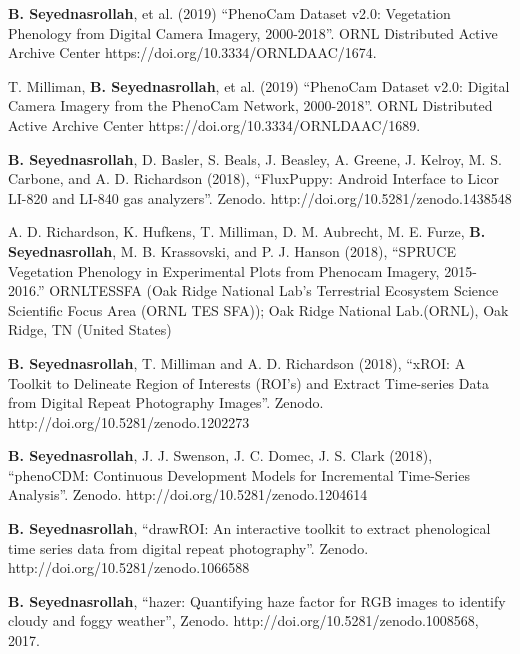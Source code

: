 \documentclass[10pt]{article}
\newenvironment{changemargin}[2]{%
  \begin{list}{}{%
    \setlength{\topsep}{0pt}%
    \setlength{\leftmargin}{#1}%
    \setlength{\rightmargin}{#2}%
    \setlength{\listparindent}{\parindent}%
    \setlength{\itemindent}{\parindent}%
    \setlength{\parsep}{\parskip}%
  }%
  \item[]}{\end{list}
}
\newenvironment{body} {
	\vspace*{-2pt}
	\begin{changemargin}{-0.5in}{-0.5in}
  }
	{\end{changemargin}
}
\begin{document}
\begin{body}

\textbf{B. Seyednasrollah}, et al. (2019) ``PhenoCam Dataset v2.0: Vegetation Phenology from Digital Camera Imagery, 2000-2018''.  ORNL Distributed Active Archive Center https://doi.org/10.3334/ORNLDAAC/1674. 
\\ \medskip

T. Milliman, \textbf{B. Seyednasrollah}, et al. (2019) ``PhenoCam Dataset v2.0: Digital Camera Imagery from the PhenoCam Network, 2000-2018''. ORNL Distributed Active Archive Center https://doi.org/10.3334/ORNLDAAC/1689. 
\\ \medskip

\textbf{B. Seyednasrollah}, D. Basler, S. Beals, J. Beasley, A. Greene, J. Kelroy, M. S. Carbone, and A. D. Richardson (2018), ``FluxPuppy: Android Interface to Licor LI-820 and LI-840 gas analyzers''. Zenodo. http://doi.org/10.5281/zenodo.1438548\\ \medskip

A. D. Richardson, K. Hufkens, T. Milliman, D. M. Aubrecht, M. E. Furze, \textbf{B. Seyednasrollah}, M. B. Krassovski, and P. J. Hanson (2018), ``SPRUCE Vegetation Phenology in Experimental Plots from Phenocam Imagery, 2015-2016.'' ORNLTESSFA (Oak Ridge National Lab's Terrestrial Ecosystem Science Scientific Focus Area (ORNL TES SFA)); Oak Ridge National Lab.(ORNL), Oak Ridge, TN (United States)\\ \medskip

\textbf{B. Seyednasrollah}, T. Milliman and A. D. Richardson (2018),  ``xROI: A Toolkit to Delineate Region of Interests (ROI's) and Extract Time-series Data from Digital Repeat Photography Images''. Zenodo. http://doi.org/10.5281/zenodo.1202273\\ \medskip

\textbf{B. Seyednasrollah}, J. J. Swenson, J. C. Domec, J. S. Clark (2018),  ``phenoCDM: Continuous Development Models for Incremental Time-Series Analysis''. Zenodo. http://doi.org/10.5281/zenodo.1204614\\ \medskip

\textbf{B. Seyednasrollah},  ``drawROI: An interactive toolkit to extract phenological time series data from digital repeat photography''. Zenodo. http://doi.org/10.5281/zenodo.1066588\\ \medskip

   \textbf{B. Seyednasrollah}, ``hazer: Quantifying haze factor for RGB images to identify cloudy and foggy weather'', Zenodo. http://doi.org/10.5281/zenodo.1008568, 2017. \\ \medskip


\end{body}
\end{document}

